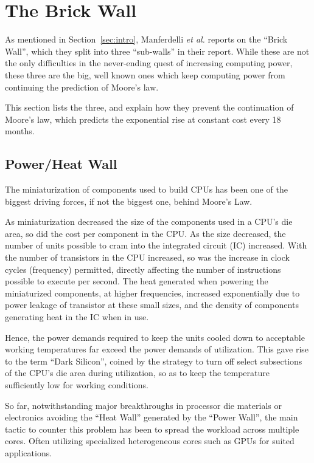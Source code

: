 
\section{The Brick Wall}
\label{sec:background}

As mentioned in Section~\ref{sec:intro}, Manferdelli \textit{et al.}\cite{4484943} reports on the ``Brick Wall'', which they split into three ``sub-walls'' in their report.
While these are not the only difficulties in the never-ending quest of increasing computing power, these three are the big, well known ones which keep computing power from continuing the prediction of Moore's law.

This section lists the three, and explain how they prevent the continuation of Moore's law, which predicts the exponential rise at constant cost every 18 months.


\subsection{Power/Heat Wall}

The miniaturization of components used to build CPUs has been one of the biggest driving forces, if not the biggest one, behind Moore's Law.

As miniaturization decreased the size of the components used in a CPU's die area, so did the cost per component in the CPU.
As the size decreased, the number of units possible to cram into the integrated circuit (IC) increased.
With the number of transistors in the CPU increased, so was the increase in clock cycles (frequency) permitted, directly affecting the number of instructions possible to execute per second.
The heat generated when powering the miniaturized components, at higher frequencies, increased exponentially due to power leakage of transistor at these small sizes, and the density of components generating heat in the IC when in use.

Hence, the power demands required to keep the units cooled down to acceptable working temperatures far exceed the power demands of utilization.
This gave rise to the term ``Dark Silicon'', coined by the strategy to turn off select subsections of the CPU's die area during utilization, so as to keep the temperature sufficiently low for working conditions.

So far, notwithstanding major breakthroughs in processor die materials or electronics avoiding the ``Heat Wall'' generated by the ``Power Wall'', the main tactic to counter this problem has been to spread the workload across multiple cores.
Often utilizing specialized heterogeneous cores such as GPUs for suited applications.

